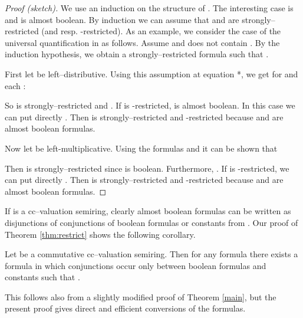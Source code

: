 \documentclass[runningheads, envcountsame, a4paper]{llncs}
\begin{document}
\begin{proof}[Proof (sketch)]
	We use an induction on the structure of . The interesting case is  and  is almost boolean.
By induction we can assume that  and  are strongly--restricted (and resp. -restricted).
As an example,
we consider the case of the universal quantification in  as follows.
Assume  and  does not contain .
By the induction hypothesis, we obtain a strongly--restricted formula  such that .
\par 
First let  be left--distributive. Using this assumption at equation *, we get for  and each :

So  is strongly--restricted and .
If  is -restricted,  is almost boolean. In this case we can put directly . Then  is strongly--restricted and -restricted because  and  are almost boolean formulas.
\par
Now let  be left-multiplicative.
Using the formulas  and  it can be shown that

Then  is strongly--restricted since  is boolean. Furthermore,
.
If  is -restricted, we can put directly . Then  is strongly--restricted and -restricted because  and  are almost boolean formulas.
\end{proof}
If  is a cc--valuation semiring, clearly
 almost boolean formulas can be written as disjunctions
 of conjunctions of boolean formulas or constants from .
 Our proof of Theorem \ref{thm:restrict}  shows the following corollary.
\begin{Folgerung}
 Let  be a commutative cc--valuation semiring.
 Then for any formula  there exists a formula  in which conjunctions occur
 only between boolean formulas and constants such that .
\end{Folgerung}
 This follows also from a slightly modified proof of Theorem \ref{main},
 but the present proof gives direct and efficient
 conversions of the formulas.
\end{document}
